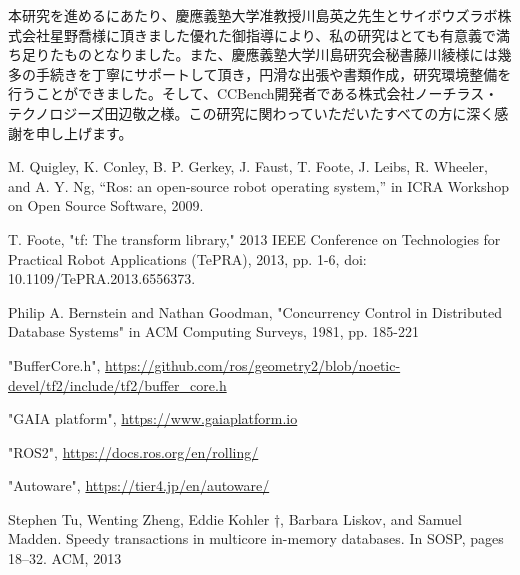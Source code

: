 \documentclass[a4paper]{jreport}	%
\begin{document}
本研究を進めるにあたり、慶應義塾大学准教授川島英之先生とサイボウズラボ株式会社星野喬様に頂きました優れた御指導により、私の研究はとても有意義で満ち足りたものとなりました。また、慶應義塾大学川島研究会秘書藤川綾様には幾多の手続きを丁寧にサポートして頂き，円滑な出張や書類作成，研究環境整備を行うことができました。そして、CCBench開発者である株式会社ノーチラス・テクノロジーズ田辺敬之様。この研究に関わっていただいたすべての方に深く感謝を申し上げます。

\newpage
{}
\renewcommand{\bibname}{参考文献}



%
%

	
\begin{thebibliography}{99}


 M. Quigley, K. Conley, B. P. Gerkey, J. Faust, T. Foote, J. Leibs, R. Wheeler, and A. Y. Ng, “Ros: an open-source robot operating system,” in ICRA Workshop on Open Source Software, 2009.

 T. Foote, "tf: The transform library," 2013 IEEE Conference on Technologies for Practical Robot Applications (TePRA), 2013, pp. 1-6, doi: 10.1109/TePRA.2013.6556373.

 Philip A. Bernstein and Nathan Goodman, "Concurrency Control in Distributed Database Systems" in ACM Computing Surveys, 1981, pp. 185-221

 "BufferCore.h", \url{https://github.com/ros/geometry2/blob/noetic-devel/tf2/include/tf2/buffer_core.h}

 "GAIA platform", \url{https://www.gaiaplatform.io}

 "ROS2", \url{https://docs.ros.org/en/rolling/}

 "Autoware", \url{https://tier4.jp/en/autoware/}

 Stephen Tu, Wenting Zheng, Eddie Kohler †, Barbara Liskov,
and Samuel Madden. Speedy transactions in multicore in-memory
databases. In SOSP, pages 18–32. ACM, 2013

\end{thebibliography}
\end{document}
